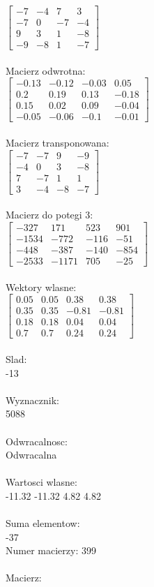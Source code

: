 \documentclass[a4paper,12pt]{article}
\begin{document}
$\begin{bmatrix} -7&-4&7&3\\-7&0&-7&-4\\9&3&1&-8\\-9&-8&1&-7 \end{bmatrix}$
\\
\\
Macierz odwrotna:\\

$\begin{bmatrix} -0.13&-0.12&-0.03&0.05\\0.2&0.19&0.13&-0.18\\0.15&0.02&0.09&-0.04\\-0.05&-0.06&-0.1&-0.01 \end{bmatrix}$
\\
\\
Macierz transponowana:\\

$\begin{bmatrix} -7&-7&9&-9\\-4&0&3&-8\\7&-7&1&1\\3&-4&-8&-7 \end{bmatrix}$
\\
\\
Macierz do potegi 3:\\

$\begin{bmatrix} -327&171&523&901\\-1534&-772&-116&-51\\-448&-387&-140&-854\\-2533&-1171&705&-25 \end{bmatrix}$
\\
\\
Wektory wlasne:\\

$\begin{bmatrix} 0.05&0.05&0.38&0.38\\0.35&0.35&-0.81&-0.81\\0.18&0.18&0.04&0.04\\0.7&0.7&0.24&0.24 \end{bmatrix}$
\\
\\
Slad:\\
-13
\\
\\
Wyznacznik:\\
5088
\\
\\
Odwracalnosc:\\
Odwracalna
\\
\\
Wartosci wlasne:\\
-11.32 -11.32 4.82 4.82
\\
\\
Suma elementow:\\
-37
\\
\newpage
Numer macierzy:
399
\\
\\
Macierz:\\
\end{document}
